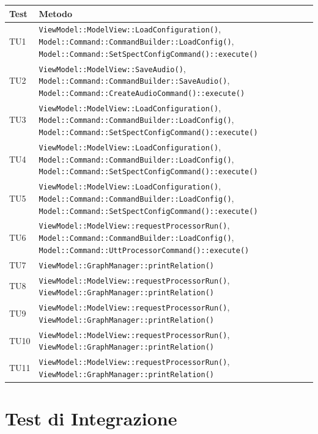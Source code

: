 \documentclass[openany,12pt,a4paper]{report}
\begin{document}
\begin{longtable}{| p{2.5cm} |p{11cm}|}
	\hline
	\textbf{Test} & \textbf{Metodo}\\
	\hline
	\endhead
	TU1&\verb|ViewModel::ModelView::LoadConfiguration()|,
	\verb|Model::Command::CommandBuilder::LoadConfig()|, \verb|Model::Command::SetSpectConfigCommand()::execute()|
	\\[1em]	
	\hline	
	TU2&\verb|ViewModel::ModelView::SaveAudio()|, \verb|Model::Command::CommandBuilder::SaveAudio()|, \verb|Model::Command::CreateAudioCommand()::execute()|
	\\[1em]	
	\hline	
	TU3&\verb|ViewModel::ModelView::LoadConfiguration()|, \verb|Model::Command::CommandBuilder::LoadConfig()|, \verb|Model::Command::SetSpectConfigCommand()::execute()|
	\\[1em]	
	\hline	
	TU4&\verb|ViewModel::ModelView::LoadConfiguration()|, \verb|Model::Command::CommandBuilder::LoadConfig()|, \verb|Model::Command::SetSpectConfigCommand()::execute()|
	\\[1em]	
	\hline	
	TU5&\verb|ViewModel::ModelView::LoadConfiguration()|, \verb|Model::Command::CommandBuilder::LoadConfig()|, \verb|Model::Command::SetSpectConfigCommand()::execute()|
	\\[1em]
	\hline	
	TU6&\verb|ViewModel::ModelView::requestProcessorRun()|, \verb|Model::Command::CommandBuilder::LoadConfig()|, \verb|Model::Command::UttProcessorCommand()::execute()|
	\\[1em]
	\hline	
	TU7&\verb|ViewModel::GraphManager::printRelation()|
	\\[1em]
	\hline	
	TU8&\verb|ViewModel::ModelView::requestProcessorRun()|, \verb|ViewModel::GraphManager::printRelation()|
	\\[1em]
	\hline	
	TU9&\verb|ViewModel::ModelView::requestProcessorRun()|, \verb|ViewModel::GraphManager::printRelation()|
	\\[1em]
	\hline	
	TU10&\verb|ViewModel::ModelView::requestProcessorRun()|, \verb|ViewModel::GraphManager::printRelation()|
	\\[1em]
	\hline	
	TU11&\verb|ViewModel::ModelView::requestProcessorRun()|, \verb|ViewModel::GraphManager::printRelation()|
	\\[1em]
	\hline	
\end{longtable}

\section{Test di Integrazione}
\end{document}
